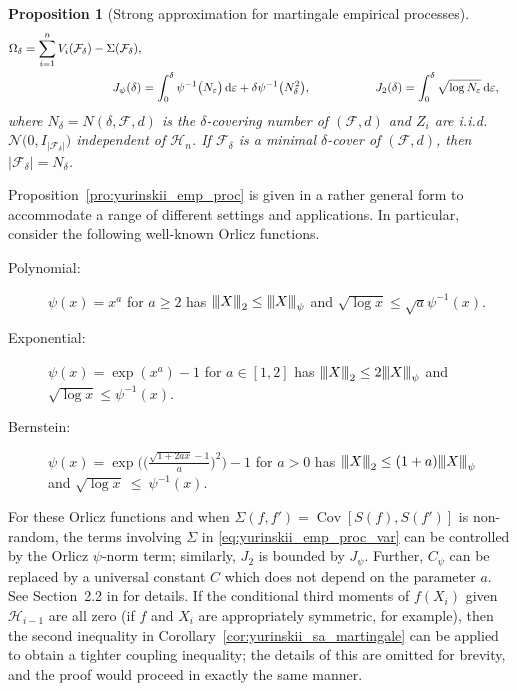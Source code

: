 \documentclass[11pt,lof]{puthesis}
\newcommand{\cH}{\ensuremath{\mathcal{H}}}
\newcommand{\cF}{\ensuremath{\mathcal{F}}}
\newcommand{\cN}{\ensuremath{\mathcal{N}}}
\newcommand{\vvvert}{{\vert\kern-0.25ex\vert\kern-0.25ex\vert}}
\DeclareMathOperator{\Cov}{Cov}
\newcommand{\diff}[1]{\,\mathrm{d}#1}
\theoremstyle{break}
\newtheorem{proposition}{Proposition}[section]
\theoremstyle{proof}
\begin{document}
\begin{proposition}[Strong approximation for martingale empirical processes]
\begin{align*}
    \Omega_\delta
    =
    \sum_{i=1}^n V_i(\cF_\delta) - \Sigma(\cF_\delta), \\
    J_\psi(\delta)
    &=
    \int_0^\delta \psi^{-1}\big( N_\varepsilon \big)
    \diff{\varepsilon}
    + \delta \psi^{-1} \big( N_\delta^2 \big),
    \hspace*{19mm}
    J_2(\delta)
    = \int_0^\delta \sqrt{\log N_\varepsilon}
    \diff{\varepsilon},
  \end{align*}
  where $N_\delta = N(\delta, \cF, d)$
  is the $\delta$-covering number of $(\cF, d)$
  and $Z_i$ are i.i.d.\ $\cN\big(0, I_{|\cF_\delta|}\big)$
  independent of $\cH_n$.
  If $\cF_\delta$ is a minimal $\delta$-cover
  of $(\cF, d)$, then $|\cF_\delta| = N_\delta$.
\end{proposition}

Proposition~\ref{pro:yurinskii_emp_proc}
is given in a rather general form to accommodate a range of different
settings and applications.
In particular, consider the following well-known Orlicz functions.
%
\begin{description}

  \item[Polynomial:]
    $\psi(x) = x^a$ for $a \geq 2$
    has $\vvvert X \vvvert_2 \leq \vvvert X \vvvert_\psi$ and
    $\sqrt{\log x} \leq \sqrt{a} \psi^{-1}(x)$.

  \item[Exponential:]
    $\psi(x) = \exp(x^a) - 1$ for $a \in [1,2]$
    has $\vvvert X \vvvert_2 \leq 2\vvvert X \vvvert_\psi$ and
    $\sqrt{\log x} \leq \psi^{-1}(x)$.

  \item[Bernstein:]
    $\psi(x) = \exp
    \Big(
      \Big(\frac{\sqrt{1+2ax}-1}{a}\Big)^{2}
    \Big)-1$
    for $a > 0$ has
    $\vvvert X \vvvert_2 \leq (1+a)\vvvert X \vvvert_\psi$ \\ and
    $\sqrt{\log x}~\leq~\psi^{-1}(x)$.

\end{description}
%
For these Orlicz functions and when $\Sigma(f, f') = \Cov[S(f), S(f')]$ is
non-random, the terms involving $\Sigma$ in \eqref{eq:yurinskii_emp_proc_var}
can be
controlled by the Orlicz $\psi$-norm term; similarly, $J_2$ is bounded by
$J_\psi$. Further, $C_\psi$ can be replaced by a universal constant $C$ which
does not depend on the parameter $a$. See Section~2.2 in \citet{van1996weak}
for details. If the conditional third moments of $f(X_i)$ given $\cH_{i-1}$ are
all zero (if $f$ and $X_i$ are appropriately symmetric, for example), then the
second inequality in Corollary~\ref{cor:yurinskii_sa_martingale} can be applied
to obtain
a tighter coupling inequality; the details of this are omitted for brevity, and
the proof would proceed in exactly the same manner.
\end{document}
